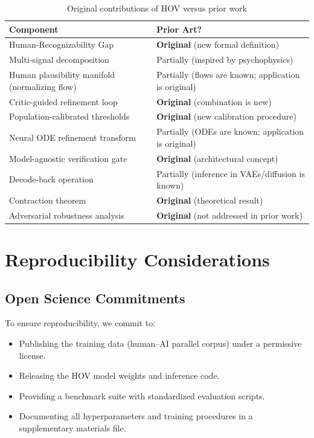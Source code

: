 \documentclass[12pt,oneside]{article}
\begin{document}
{{{{{{{{{{{\begin{table}[H]
\centering
\caption{Original contributions of HOV versus prior work}
\begin{tabular}{@{}ll@{}}
\toprule
\textbf{Component} & \textbf{Prior Art?} \\
\midrule
Human-Recognizability Gap & \textbf{Original} (new formal definition) \\
Multi-signal decomposition & Partially (inspired by psychophysics) \\
Human plausibility manifold (normalizing flow) & Partially (flows are known; application is original) \\
Critic-guided refinement loop & \textbf{Original} (combination is new) \\
Population-calibrated thresholds & \textbf{Original} (new calibration procedure) \\
Neural ODE refinement transform & Partially (ODEs are known; application is original) \\
Model-agnostic verification gate & \textbf{Original} (architectural concept) \\
Decode-back operation & Partially (inference in VAEs/diffusion is known) \\
Contraction theorem & \textbf{Original} (theoretical result) \\
Adversarial robustness analysis & \textbf{Original} (not addressed in prior work) \\
\bottomrule
\end{tabular}
\end{table}

\section{Reproducibility Considerations}

\subsection{Open Science Commitments}

To ensure reproducibility, we commit to:
\begin{itemize}[noitemsep]
    \item Publishing the training data (human--AI parallel corpus) under a permissive license.
    \item Releasing the HOV model weights and inference code.
    \item Providing a benchmark suite with standardized evaluation scripts.
    \item Documenting all hyperparameters and training procedures in a supplementary materials file.
\end{itemize}

}}}}}}}}}}}
\end{document}
